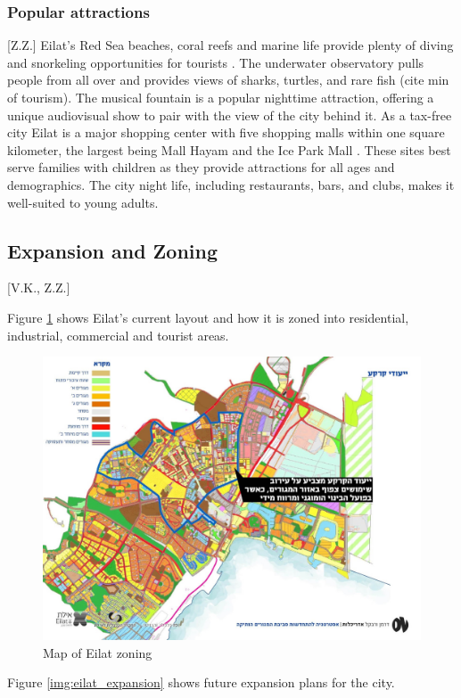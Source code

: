\documentclass[12pt]{article}                       %
\begin{document}
\subsubsection{Popular attractions}[Z.Z.]
Eilat's Red Sea beaches, coral reefs and marine life provide plenty of diving and snorkeling opportunities for tourists \cite{Benner2017UpgradingEilat}. The underwater observatory pulls people from all over and provides views of sharks, turtles, and rare fish (cite min of tourism). The musical fountain is a popular nighttime attraction, offering a unique audiovisual show to pair with the view of the city behind it. As a tax-free city Eilat is a major shopping center with five shopping malls within one square kilometer, the largest being Mall Hayam and the Ice Park Mall \cite{Benner2017UpgradingEilat}. These sites best serve families with children as they provide attractions for all ages and demographics. The city night life, including restaurants, bars, and clubs, makes it well-suited to young adults.

\subsection{Expansion and Zoning}[V.K., Z.Z.]

Figure \ref{img:eilat_zoning} shows Eilat's current layout and how it is zoned into residential, industrial, commercial and tourist areas. 

\begin{figure}[H]
    \centering
    \includegraphics[width=12cm]{images/eilat_zoning.jpg}
    \caption{Map of Eilat zoning}
    \label{img:eilat_zoning}
\end{figure}
Figure \ref{img:eilat_expansion} shows future expansion plans for the city.
\end{document}
